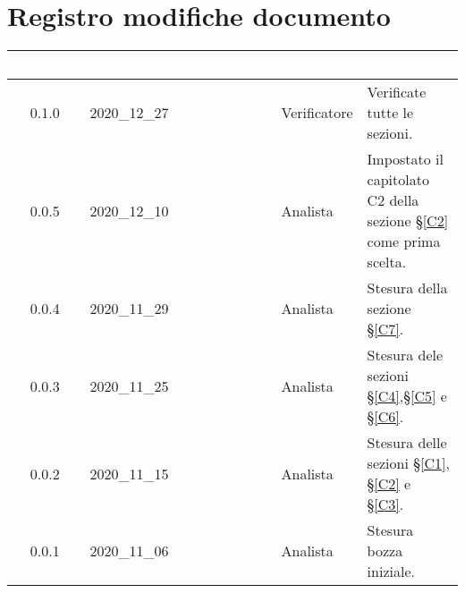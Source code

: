 \section*{Registro modifiche documento}
{
\renewcommand{\arraystretch}{1.5}
\centering
\begin{longtable}{c c C{2.3cm} C{3cm} C{3.2cm}}


 \textcolor{white}{\textbf{Versione}} &
    \textcolor{white}{\textbf{Data}} &
    \textcolor{white}{\textbf{Nominativo}} &
    \textcolor{white}{\textbf{Ruolo}} &
    \textcolor{white}{\textbf{Descrizione}}\\	
    \endhead
    
    
     0.1.0 & 2020\_12\_27 & \TG{} & Verificatore & Verificate tutte le sezioni. \\
    
    0.0.5 & 2020\_12\_10 & \FF{} & Analista & Impostato il capitolato C2 della sezione \S\ref{C2} come prima scelta.  \\

    0.0.4 & 2020\_11\_29 & \FF{} & Analista & Stesura della sezione \S\ref{C7}.  \\
    
    0.0.3 & 2020\_11\_25 & \FF{} & Analista & Stesura dele sezioni \S\ref{C4},\S \ref{C5} e \S\ref{C6}.  \\
    
    0.0.2 & 2020\_11\_15 & \FF{} & Analista & Stesura delle sezioni \S\ref{C1}, \S\ref{C2} e \S\ref{C3}.  \\
            
    0.0.1 & 2020\_11\_06 & \FF{} & Analista & Stesura bozza iniziale.  \\
			
\end{longtable}
}